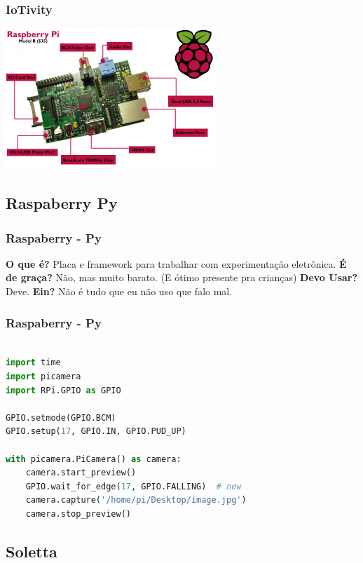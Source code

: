 \documentclass{beamer}
\begin{document}
\begin{frame} \frametitle{ IoTivity }
    \includegraphics[width=300px]{images/raspy}
\end{frame}

\subsection{Raspaberry Py}
\begin{frame} \frametitle{ Raspaberry - Py }
    \textbf{O que é?}
\linebreak
    Placa e framework para trabalhar com experimentação eletrônica.
\linebreak
    \textbf{É de graça?}
\linebreak
    Não, mas muito barato. (E ótimo presente pra crianças)
\linebreak
    \textbf{Devo Usar?}
\linebreak
    Deve.
\linebreak
    \textbf{Ein?}
    \pause
\linebreak
    Não é tudo que eu não uso que falo mal.
\end{frame}

\begin{frame}[fragile] \frametitle{ Raspaberry - Py}
    \begin{lstlisting}[language=Python]

import time
import picamera
import RPi.GPIO as GPIO

GPIO.setmode(GPIO.BCM)
GPIO.setup(17, GPIO.IN, GPIO.PUD_UP)

with picamera.PiCamera() as camera:
    camera.start_preview()
    GPIO.wait_for_edge(17, GPIO.FALLING)  # new
    camera.capture('/home/pi/Desktop/image.jpg')
    camera.stop_preview()

    \end{lstlisting}
\end{frame}

\subsection{Soletta}
\end{document}
